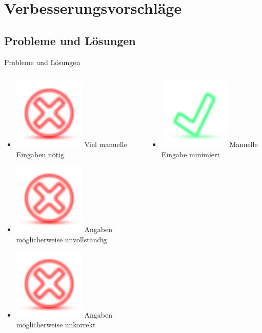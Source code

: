 \documentclass{beamer} %
\begin{document}
\section{Verbesserungsvorschläge}
\subsection{Probleme und Lösungen}
\begin{frame}{Probleme und Lösungen}
	\begin{columns}[c]
		\begin{column}{0.5\textwidth}
			\begin{itemize}
				\item \includegraphics[height=\baselineskip]{material/dialog-cancel.png} Viel manuelle Eingaben nötig
				\item \includegraphics[height=\baselineskip]{material/dialog-cancel.png} Angaben möglicherweise unvollständig
				\item \includegraphics[height=\baselineskip]{material/dialog-cancel.png} Angaben möglicherweise unkorrekt
			\end{itemize}
		\end{column}
		\pause
		\begin{column}{0.5\textwidth}
			\begin{itemize}
				\item \includegraphics[height=\baselineskip]{material/dialog-ok.png} Manuelle Eingabe minimiert

\end{itemize}
\end{column}
\end{columns}
\end{frame}
\end{document}
